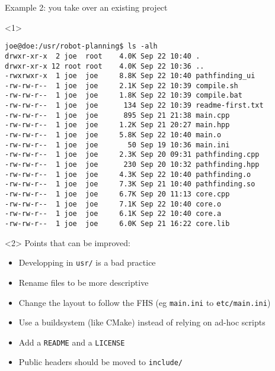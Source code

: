 \documentclass[compress]{beamer}
\begin{document}
\begin{frame}[fragile]{Example 2: you take over an existing project}


\begin{onlyenv}<1>
\begin{verbatim}
joe@doe:/usr/robot-planning$ ls -alh
drwxr-xr-x  2 joe  root    4.0K Sep 22 10:40 .
drwxr-xr-x 12 root root    4.0K Sep 22 10:36 ..
-rwxrwxr-x  1 joe  joe     8.8K Sep 22 10:40 pathfinding_ui
-rw-rw-r--  1 joe  joe     2.1K Sep 22 10:39 compile.sh
-rw-rw-r--  1 joe  joe     1.8K Sep 22 10:39 compile.bat
-rw-rw-r--  1 joe  joe      134 Sep 22 10:39 readme-first.txt
-rw-rw-r--  1 joe  joe      895 Sep 21 21:38 main.cpp
-rw-rw-r--  1 joe  joe     1.2K Sep 21 20:27 main.hpp
-rw-rw-r--  1 joe  joe     5.8K Sep 22 10:40 main.o
-rw-rw-r--  1 joe  joe       50 Sep 19 10:36 main.ini
-rw-rw-r--  1 joe  joe     2.3K Sep 20 09:31 pathfinding.cpp
-rw-rw-r--  1 joe  joe      230 Sep 20 10:32 pathfinding.hpp
-rw-rw-r--  1 joe  joe     4.3K Sep 22 10:40 pathfinding.o
-rw-rw-r--  1 joe  joe     7.3K Sep 21 10:40 pathfinding.so
-rw-rw-r--  1 joe  joe     6.7K Sep 20 11:13 core.cpp
-rw-rw-r--  1 joe  joe     7.1K Sep 22 10:40 core.o
-rw-rw-r--  1 joe  joe     6.1K Sep 22 10:40 core.a
-rw-rw-r--  1 joe  joe     6.0K Sep 21 16:22 core.lib
\end{verbatim}

\end{onlyenv}

    \begin{onlyenv}<2>
        Points that can be improved:

        \begin{itemize}
            \item Developping in \texttt{usr/} is a bad practice
            \item Rename files to be more descriptive
            \item Change the layout to follow the FHS (eg \texttt{main.ini} to
                \texttt{etc/main.ini})
            \item Use a buildsystem (like CMake) instead of relying on ad-hoc scripts
            \item Add a \texttt{README} and a \texttt{LICENSE}
            \item Public headers should be moved to \texttt{include/}
        \end{itemize}
    \end{onlyenv}
\end{frame}
\end{document}
